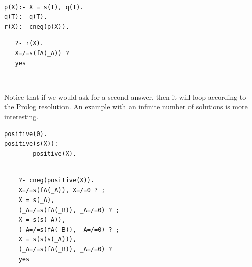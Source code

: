 \documentclass{tlp}
\begin{document}
{
\begin{minipage}{2in}
\begin{verbatim}

p(X):- X = s(T), q(T).
q(T):- q(T).
r(X):- cneg(p(X)).
\end{verbatim}
\end{minipage}
\begin{minipage}{2in}
\begin{verbatim} 
   ?- r(X).
   X=/=s(fA(_A)) ?
   yes
\end{verbatim} 
\end{minipage}\\
}


Notice that if we would ask for a second answer, then it will loop
according to the Prolog resolution. An example with an infinite number
of solutions is more interesting.

{
\begin{minipage}{1.5in}
\begin{verbatim}
positive(0). 
positive(s(X)):-
        positive(X).  
\end{verbatim}
\end{minipage} 
\begin{minipage}{2.5in}
\begin{verbatim} 

    ?- cneg(positive(X)).
    X=/=s(fA(_A)), X=/=0 ? ;
    X = s(_A), 
    (_A=/=s(fA(_B)), _A=/=0) ? ;
    X = s(s(_A)), 
    (_A=/=s(fA(_B)), _A=/=0) ? ;
    X = s(s(s(_A))),
    (_A=/=s(fA(_B)), _A=/=0) ? 
    yes
\end{verbatim} 
\end{minipage}
}




\end{document}

